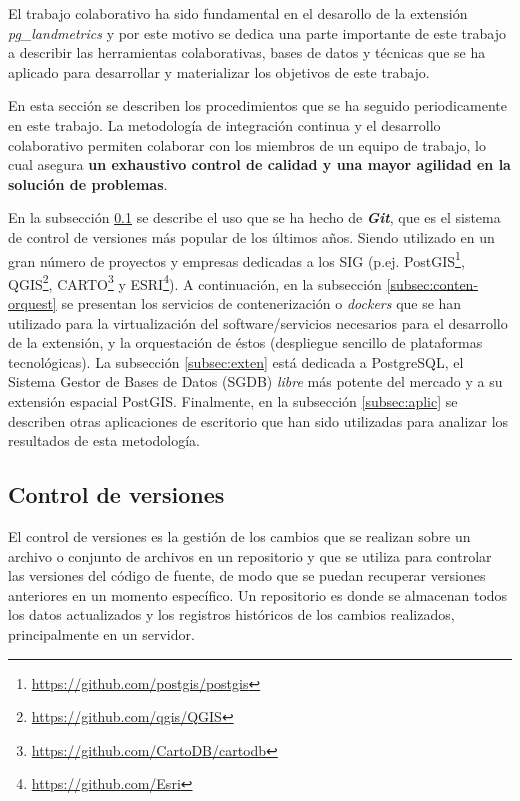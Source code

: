 El trabajo colaborativo ha sido fundamental en el desarollo de la extensión \textit{pg\_landmetrics} y por este motivo se dedica una parte importante de este trabajo a describir las herramientas colaborativas, bases de datos y técnicas que se ha aplicado para desarrollar y materializar los objetivos de este trabajo.

En esta sección se describen los procedimientos que se ha seguido periodicamente en este trabajo. La metodología de integración continua y el desarrollo colaborativo permiten colaborar con los miembros de un equipo de trabajo, lo cual asegura \textbf{un exhaustivo control de calidad y una mayor agilidad en la solución de problemas}.

En la subsección \ref{subsec:control} se describe el uso que se ha hecho de \textbf{\textit{Git}}, que es el sistema de control de versiones más popular de los últimos años. Siendo utilizado en un gran número de proyectos y empresas dedicadas a los SIG (p.ej. PostGIS\footnote{\href{https://github.com/postgis/postgis}{https://github.com/postgis/postgis}}, QGIS\footnote{\href{https://github.com/qgis/QGIS}{https://github.com/qgis/QGIS}}, CARTO\footnote{\href{https://github.com/CartoDB/cartodb}{https://github.com/CartoDB/cartodb}} y ESRI\footnote{\href{https://github.com/Esri}{https://github.com/Esri}}). A continuación, en la subsección \ref{subsec:conten-orquest} se presentan los servicios de contenerización o \textit{dockers} que se han utilizado para la virtualización del software/servicios necesarios para el desarrollo de la extensión, y la orquestación de éstos (despliegue sencillo de plataformas tecnológicas). La subsección \ref{subsec:exten} está dedicada a PostgreSQL, el Sistema Gestor de Bases de Datos (SGDB) \textit{libre} más potente del mercado y a su extensión espacial PostGIS. Finalmente, en la subsección \ref{subsec:aplic} se describen otras aplicaciones de escritorio que han sido utilizadas para analizar los resultados de esta metodología.


\subsection{Control de versiones}\label{subsec:control}

El control de versiones es la gestión de los cambios que se realizan sobre un archivo o conjunto de archivos en un repositorio y que se utiliza para controlar las versiones del código de fuente, de modo que se puedan recuperar versiones anteriores en un momento específico. Un repositorio es donde se almacenan todos los datos actualizados y los registros históricos de los cambios realizados, principalmente en un servidor.

